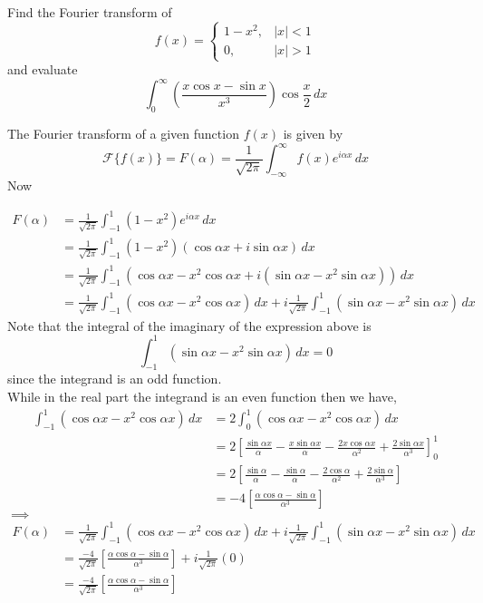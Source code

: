 \documentclass[12pt]{scrartcl}
\begin{document}
\begin{ques}
	Find the Fourier transform of 
	\[
	f(x) = \begin{cases}
				1 - x^2, & |x| < 1 \\
				0, & |x| > 1
\end{cases}
\]
and evaluate 
\[
	\int_{0}^{\infty} \left( \frac{x\cos x - \sin x}{x^3} \right) \cos \frac{x}{2} \, dx
\]
\end{ques}

\begin{soln}
	The Fourier transform of a given function $f(x)$ is given by
	\[
	\mathcal{F}\{ f(x) \} = F(\alpha) = \frac{1}{\sqrt{2\pi}} \int_{-\infty}^{\infty} f(x) e^{i\alpha x} \, dx
\]
Now 

\begin{align*}
	F(\alpha) & = \frac{1}{\sqrt{2\pi}} \int_{-1}^{1} (1 - x^2) e^{i\alpha x} \, dx \\
			  & = \frac{1}{\sqrt{2\pi}} \int_{-1}^{1} (1 - x^2) (\cos \alpha x + i\sin \alpha x) \, dx \\
			  & = \frac{1}{\sqrt{2\pi}} \int_{-1}^{1} (\cos \alpha x - x^2 \cos \alpha x + i(\sin \alpha x - x^2 \sin \alpha x)) \, dx \\
			  & = \frac{1}{\sqrt{2\pi}} \int_{-1}^{1} (\cos \alpha x - x^2 \cos \alpha x) \, dx + i \frac{1}{\sqrt{2\pi}} \int_{-1}^{1}(\sin \alpha x - x^2 \sin \alpha x) \, dx
\end{align*}
Note that the integral of the imaginary of the expression above is
\[
	\int_{-1}^{1}(\sin \alpha x - x^2 \sin \alpha x) \, dx = 0
\]
since the integrand is an odd function.\\
While in the real part the integrand is an even function then we have,
\begin{align*}
	\int_{-1}^{1} (\cos \alpha x - x^2 \cos \alpha x) \, dx & = 2\int_{0}^{1} (\cos \alpha x - x^2 \cos \alpha x) \, dx \\
															& = 2\left[ \frac{\sin \alpha x}{\alpha} - \frac{x\sin \alpha x}{\alpha} - \frac{2x\cos \alpha x}{\alpha^2} + \frac{2\sin \alpha x}{\alpha^3} \right]_{0}^{1} \\
															& = 2\left[ \frac{\sin \alpha }{\alpha} - \frac{\sin \alpha }{\alpha} - \frac{2\cos \alpha }{\alpha^2} + \frac{2\sin \alpha }{\alpha^3} \right] \\
															& = -4 \left[ \frac{\alpha \cos \alpha - \sin \alpha}{\alpha^3} \right]
\end{align*}
$\implies $
	\begin{align*}
	F(\alpha) & = \frac{1}{\sqrt{2\pi}} \int_{-1}^{1} (\cos \alpha x - x^2 \cos \alpha x) \, dx + i \frac{1}{\sqrt{2\pi}} \int_{-1}^{1}(\sin \alpha x - x^2 \sin \alpha x) \, dx \\
			  & = \frac{-4}{\sqrt{2\pi}} \left[ \frac{\alpha \cos \alpha - \sin \alpha}{\alpha^3} \right] + i\frac{1}{\sqrt{2\pi}} (0) \\
			  & = \frac{-4}{\sqrt{2\pi}}  \left[ \frac{\alpha \cos \alpha - \sin \alpha}{\alpha^3} \right]
\end{align*}


\end{soln}
\end{document}
